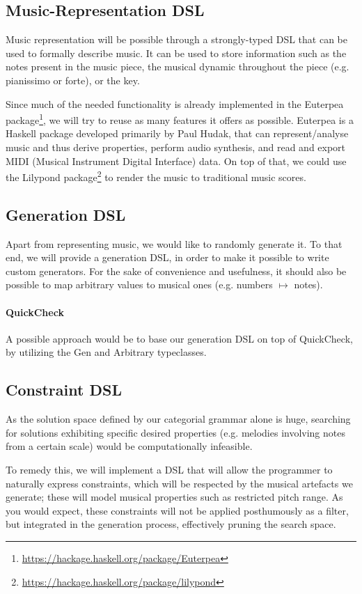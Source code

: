 \documentclass[11pt,a4paper]{article}
\newcommand{\site}[1]{\footnote{\url{#1}}}
\begin{document}
\subsection{Music-Representation DSL}
Music representation will be possible through a strongly-typed DSL that can be used to formally describe music. It can be used to store information such as the notes present in the music piece, the musical dynamic throughout the piece (e.g. pianissimo or forte), or the key.

Since much of the needed functionality is already implemented in the Euterpea package\site{https://hackage.haskell.org/package/Euterpea}, we will try to reuse as many features it offers as possible. Euterpea is a Haskell package developed primarily by Paul Hudak, that can represent/analyse music and thus derive properties, perform audio synthesis, and read and export MIDI (Musical Instrument Digital Interface) data. On top of that, we could use the Lilypond package\site{https://hackage.haskell.org/package/lilypond} to render the music to traditional music scores.

\subsection{Generation DSL}
Apart from representing music, we would like to randomly generate it. To that end, we will provide a generation DSL, in order to make it possible to write custom generators. For the sake of convenience and usefulness, it should also be possible to map arbitrary values to musical ones (e.g. numbers $\mapsto$ notes).

\paragraph{QuickCheck}
A possible approach would be to base our generation DSL on top of QuickCheck, by utilizing the Gen and Arbitrary typeclasses.

\subsection{Constraint DSL}
As the solution space defined by our categorial grammar alone is huge, searching for solutions exhibiting specific desired properties (e.g. melodies involving notes from a certain scale) would be computationally infeasible.

To remedy this, we will implement a DSL that will allow the programmer to naturally express constraints, which will be respected by the musical artefacts we generate; these will model musical properties such as restricted pitch range. As you would expect, these constraints will not be applied posthumously as a filter, but integrated in the generation process, effectively pruning the search space.
\end{document}
